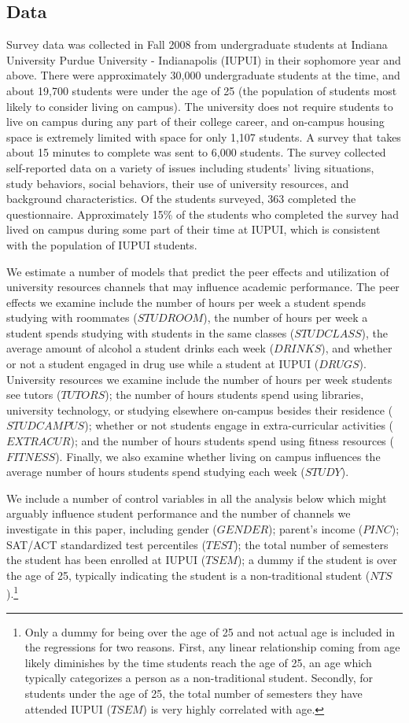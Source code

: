 \documentclass[10pt]{article}
\begin{document}
\subsection{Data}
Survey data was collected in Fall 2008 from undergraduate students at Indiana University Purdue University - Indianapolis (IUPUI) in their sophomore year and above.  There were approximately 30,000 undergraduate students at the time, and about 19,700 students were under the age of 25 (the population of students most likely to consider living on campus).  The university does not require students to live on campus during any part of their college career, and on-campus housing space is extremely limited with space for only 1,107 students.  A survey that takes about 15 minutes to complete was sent to 6,000 students.  The survey collected self-reported data on a variety of issues including students' living situations, study behaviors, social behaviors, their use of university resources, and background characteristics.  Of the students surveyed, 363 completed the questionnaire.  Approximately 15\% of the students who completed the survey had lived on campus during some part of their time at IUPUI, which is consistent with the population of IUPUI students.

We estimate a number of models that predict the peer effects and utilization of university resources channels that may influence academic performance.  The peer effects we examine include the number of hours per week a student spends studying with roommates ($STUDROOM$), the number of hours per week a student spends studying with students in the same classes ($STUDCLASS$), the average amount of alcohol a student drinks each week ($DRINKS$), and whether or not a student engaged in drug use while a student at IUPUI ($DRUGS$).  University resources we examine include the number of hours per week students see tutors ($TUTORS$); the number of hours students spend using libraries, university technology, or studying elsewhere on-campus besides their residence ($STUDCAMPUS$); whether or not students engage in extra-curricular activities ($EXTRACUR$); and the number of hours students spend using fitness resources ($FITNESS$).  Finally, we also examine whether living on campus influences the average number of hours students spend studying each week ($STUDY$).

We include a number of control variables in all the analysis below which might arguably influence student performance and the number of channels we investigate in this paper, including gender ($GENDER$); parent's income ($PINC$); SAT/ACT standardized test percentiles ($TEST$); the total number of semesters the student has been enrolled at IUPUI ($TSEM$); a dummy if the student is over the age of 25, typically indicating the student is a non-traditional student ($NTS$).\footnote{Only a dummy for being over the age of 25 and not actual age is included in the regressions for two reasons.  First, any linear relationship coming from age likely diminishes by the time students reach the age of 25, an age which typically categorizes a person as a non-traditional student.  Secondly, for students under the age of 25, the total number of semesters they have attended IUPUI ($TSEM$) is very highly correlated with age.}
\end{document}
